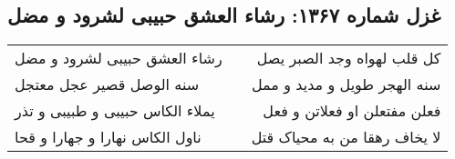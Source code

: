 \begin{center}
\section*{غزل شماره ۱۳۶۷: رشاء العشق حبیبی لشرود و مضل}
\label{sec:1367}
\begin{longtable}{l p{0.5cm} r}
رشاء العشق حبیبی لشرود و مضل
&&
کل قلب لهواه وجد الصبر یصل
\\
سنه الوصل قصیر عجل معتجل
&&
سنه الهجر طویل و مدید و ممل
\\
یملاء الکاس حبیبی و طبیبی و تذر
&&
فعلن مفتعلن او فعلاتن و فعل
\\
ناول الکاس نهارا و جهارا و قحا
&&
لا یخاف رهقا من به محیاک قتل
\\
\end{longtable}
\end{center}
